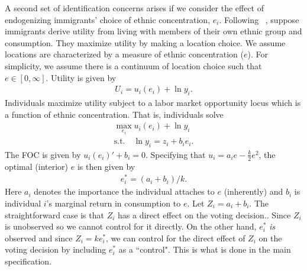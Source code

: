 \documentclass[11pt, oneside]{article}   	%
\newcommand{\eqs}[1]{\begin{align*}#1\end{align*}}
\begin{document}
A second set of identification concerns arises if we consider the effect of endogenizing immigrants' choice of ethnic concentration, $e_i$. Following ~\cite{Edin2003}, suppose immigrants derive utility from living with members of their own ethnic group and consumption. They maximize utility by making a location choice. We assume locations are characterized by a measure of ethnic concentration ($e$). For simplicity, we assume there is a continuum of location choice such that $e \in [0, \infty]$. Utility is given by
\eqs{
	U_i =u_i(e_i) + \ln y_i.
}
Individuals maximize utility subject to a labor market opportunity locus which is a function of ethnic concentration. That is, individuals solve
\eqs{
	\max_{e_i}u_i(e_i) + \ln y_i \\
	\mathrm{s.t.} \quad \ln y_i = z_i +b_i e_i.
}
The FOC is given by $u_i(e_i)'+b_i = 0$. Specifying that $u_i=a_i e-\frac{k}{2} e^2$, the optimal (interior) $e$ is then given by
\eqs{
	e_i^* = (a_i + b_i)/k.
}
Here $a_i$ denotes the importance the individual attaches to $e$ (inherently) and $b_i$ is individual $i$'s marginal return in consumption to $e$. Let $Z_i=a_i+b_i$. The straightforward case is that $Z_i$ has a direct effect on the voting decision.. Since $Z_i$ is unobserved so we cannot control for it directly. On the other hand, $e_i^*$ \emph{is} observed and since $Z_i=ke_i^*$, we can control for the direct effect of $Z_i$ on the voting decision by including $e_i^*$ as a ``control". This is what is done in the main specification.
\end{document}
